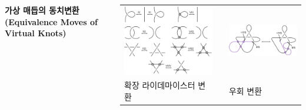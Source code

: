 \documentclass[25pt, a0paper, portrait, margin=0mm, innermargin=15mm,
     blockverticalspace=15mm, colspace=15mm, subcolspace=8mm]{tikzposter}
\def\mysection#1{\textbf{\Large\color{NTNUBlue}\sf #1}\par}
\def\myem#1{\textsf{\color{BrickRed}#1}}
\begin{document}
\begin{columns}
{\bigskip\bigskip
\mysection{가상 매듭의 동치변환(Equivalence Moves of Virtual Knots)}
\bigskip
\begin{center}
\begin{tabu} to \linewidth{X[4.5,m,c] X[.1,m,c] X[2.5,m,c]}
\includegraphics[width=\linewidth]{reide}
& & \includegraphics[width=\linewidth]{detour}
\\
\myem{확장 라이데마이스터 변환} & & \myem{우회 변환}\\
\end{tabu}
\end{center}


}
\end{columns}
\end{document}
